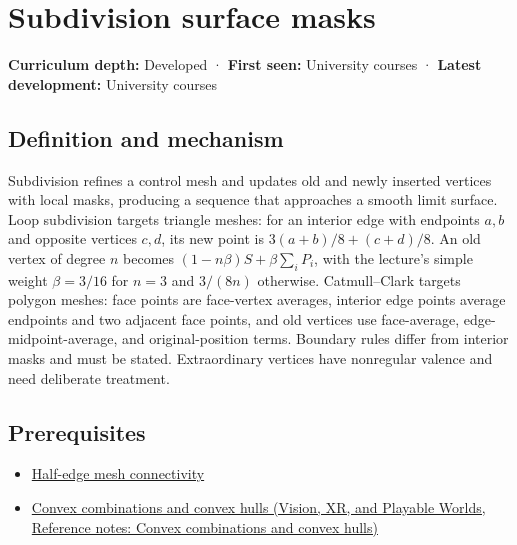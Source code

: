 \hypertarget{appendix-0234ab7f86b1}{}\label{referencestart:appendix-0234ab7f86b1}
\section{Subdivision surface masks}\label{appendix-0234ab7f86b1-subdivision-surface-masks}

\hypertarget{appendix-0234ab7f86b1-subdivision-surface-masks}{}

\textbf{Curriculum depth:} Developed · \textbf{First seen:} University courses · \textbf{Latest development:} University courses

\begin{allmightroledefinition}

\subsection{Definition and mechanism}\label{appendix-0234ab7f86b1-definition-and-mechanism}

\hypertarget{appendix-0234ab7f86b1-definition-and-mechanism}{}

Subdivision refines a control mesh and updates old and newly inserted vertices with local masks, producing a sequence that approaches a smooth limit surface. Loop subdivision targets triangle meshes: for an interior edge with endpoints \(a,b\) and opposite vertices \(c,d\), its new point is \(3(a+b)/8+(c+d)/8\). An old vertex of degree \(n\) becomes \((1-n\beta)S+\beta\sum_iP_i\), with the lecture's simple weight \(\beta=3/16\) for \(n=3\) and \(3/(8n)\) otherwise. Catmull--Clark targets polygon meshes: face points are face-vertex averages, interior edge points average endpoints and two adjacent face points, and old vertices use face-average, edge-midpoint-average, and original-position terms. Boundary rules differ from interior masks and must be stated. Extraordinary vertices have nonregular valence and need deliberate treatment.

\end{allmightroledefinition}

\subsection{Prerequisites}\label{appendix-0234ab7f86b1-prerequisites}

\hypertarget{appendix-0234ab7f86b1-prerequisites}{}

\begin{itemize}
\tightlist
\item
  \hyperref[appendix-1aea26b2307f]{Half-edge mesh connectivity}
\item
  \href{../07-Vision-XR-and-Playable-Worlds/main.pdf\#nameddest=appendix-0026ec42c9d5}{Convex combinations and convex hulls (Vision, XR, and Playable Worlds, Reference notes: Convex combinations and convex hulls)}
\end{itemize}

